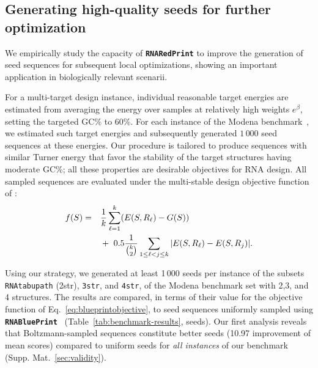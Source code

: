 \documentclass{bioinfo}
\newcommand{\Nuc}[1]{{\sf #1}}
\newcommand{\Cb}{\Nuc{C}}
\newcommand{\Gb}{\Nuc{G}}
\newcommand{\GCb}{\Gb\Cb}
\newcommand{\Software}[1]{{\ttfamily #1}}
\newcommand{\RNAblueprint}{{\tt \bfseries{}\color{black!75} RNA\textcolor{blue!70!black}{Blue}Print}}
\newcommand{\ourprog}{{\tt \bfseries{}\color{black!75}RNA\textcolor{red!70!black}{Red}Print}}
\begin{document}
\subsection{Generating high-quality seeds for further optimization}
We empirically study the capacity of \ourprog{} to improve the generation of seed sequences for subsequent local optimizations, showing an important application in biologically relevant scenarii.

For a multi-target design instance, individual reasonable target
energies are estimated from averaging the energy over samples at
relatively high weights $e^{\beta}$, setting the targeted \GCb\%
to 60\%. For each instance of the \Software{Modena}
benchmark~\citep{Taneda2015}, we estimated such target energies and
subsequently generated $1\,000$ seed sequences at these energies.
Our procedure is tailored to produce sequences with similar Turner
energy that favor the stability of the target structures having
moderate \GCb\%; all these properties are desirable objectives
for RNA design.  All sampled sequences are evaluated under the
multi-stable design objective function of \citet{Hammer2017}:
\begin{align}
  \label{eq:blueprintobjective}
    f(S)= \quad & \frac{1}{k} \sum_{\ell=1}^{k} (E(S, R_\ell) - G(S))\notag\\
   & +\ 0.5\frac{1}{\binom{k}{2}} \sum\limits_{1\leq\ell<j\leq k}|E(S,R_\ell) - E(S,R_j)|.
\end{align}

Using our strategy, we generated at least 1\,000 seeds per instance of
the subsets \texttt{RNAtabupath} (2str), \texttt{3str}, and
\texttt{4str}, of the \Software{Modena} benchmark set with 2,3, and 4
structures. The results are compared, in terms of their value for the
objective function of Eq.~\eqref{eq:blueprintobjective}, to seed
sequences uniformly sampled using \RNAblueprint{}~\citep{Hammer2017}
(Table~\ref{tab:benchmark-results}, seeds). Our first analysis reveals
that Boltzmann-sampled sequences constitute better seeds
(10.97 improvement of mean scores) compared to uniform seeds for
\emph{all instances} of our benchmark (Supp. Mat.~\ref{sec:validity}).
\end{document}
